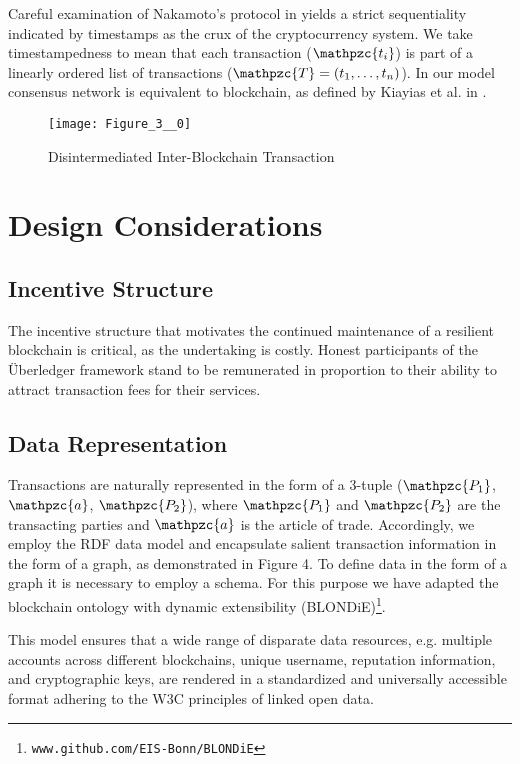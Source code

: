 Careful examination of Nakamoto's protocol in \cite{satoshi2008bitcoin} yields a strict sequentiality indicated by timestamps as the crux of the cryptocurrency system. 
We take timestampedness to mean that each transaction ($\mathpzc{t_i}$) is part of a linearly ordered list of transactions ($\mathpzc{T}=(t_1,\dots,t_n)$).
In our model consensus network is equivalent to blockchain, as defined by Kiayias et al. in \cite{garay2015bitcoin}. 

\begin{figure}
\centering
\texttt{[image: Figure\_3\_\_0]}
\caption{Disintermediated Inter-Blockchain Transaction}
\end{figure}

\section{Design Considerations}

\subsection{Incentive Structure}
The incentive structure that motivates the continued maintenance of a resilient blockchain is critical, as the undertaking is costly. 
Honest participants of the \"{U}berledger framework stand to be remunerated in proportion to their ability to attract transaction fees for their services.

\subsection{Data Representation}
Transactions are naturally represented in the form of a 3-tuple ($\mathpzc{P_1}$, $\mathpzc{a}$, $\mathpzc{P_2}$), where $\mathpzc{P_1}$ and $\mathpzc{P_2}$ are the transacting parties and $\mathpzc{a}$ is the article of trade. 
Accordingly, we employ the RDF data model and encapsulate salient transaction information in the form of a graph, as demonstrated in Figure 4. 
To define data in the form of a graph it is necessary to employ a schema.
For this purpose we have adapted the blockchain ontology with dynamic extensibility (BLONDiE)\footnote{\texttt{www.github.com/EIS-Bonn/BLONDiE}}.

This model ensures that a wide range of disparate data resources, e.g. multiple accounts across different blockchains, unique username, reputation information, and cryptographic keys, are rendered in a standardized and universally accessible format adhering to the W3C principles of linked open data.

